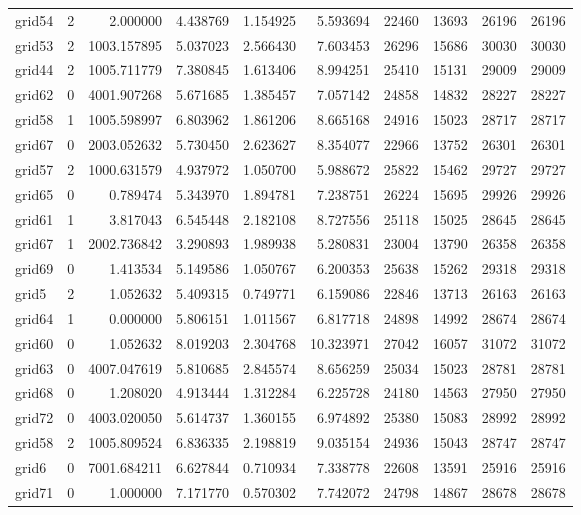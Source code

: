 \begin{longtable}{|l|r|r|r|r|r|r|r|r|r|}
grid54 & 2 & 2.000000 & 4.438769 & 1.154925 & 5.593694 & 22460 & 13693 & 26196 & 26196 \\
grid53 & 2 & 1003.157895 & 5.037023 & 2.566430 & 7.603453 & 26296 & 15686 & 30030 & 30030 \\
grid44 & 2 & 1005.711779 & 7.380845 & 1.613406 & 8.994251 & 25410 & 15131 & 29009 & 29009 \\
grid62 & 0 & 4001.907268 & 5.671685 & 1.385457 & 7.057142 & 24858 & 14832 & 28227 & 28227 \\
grid58 & 1 & 1005.598997 & 6.803962 & 1.861206 & 8.665168 & 24916 & 15023 & 28717 & 28717 \\
grid67 & 0 & 2003.052632 & 5.730450 & 2.623627 & 8.354077 & 22966 & 13752 & 26301 & 26301 \\
grid57 & 2 & 1000.631579 & 4.937972 & 1.050700 & 5.988672 & 25822 & 15462 & 29727 & 29727 \\
grid65 & 0 & 0.789474 & 5.343970 & 1.894781 & 7.238751 & 26224 & 15695 & 29926 & 29926 \\
grid61 & 1 & 3.817043 & 6.545448 & 2.182108 & 8.727556 & 25118 & 15025 & 28645 & 28645 \\
grid67 & 1 & 2002.736842 & 3.290893 & 1.989938 & 5.280831 & 23004 & 13790 & 26358 & 26358 \\
grid69 & 0 & 1.413534 & 5.149586 & 1.050767 & 6.200353 & 25638 & 15262 & 29318 & 29318 \\
grid5 & 2 & 1.052632 & 5.409315 & 0.749771 & 6.159086 & 22846 & 13713 & 26163 & 26163 \\
grid64 & 1 & 0.000000 & 5.806151 & 1.011567 & 6.817718 & 24898 & 14992 & 28674 & 28674 \\
grid60 & 0 & 1.052632 & 8.019203 & 2.304768 & 10.323971 & 27042 & 16057 & 31072 & 31072 \\
grid63 & 0 & 4007.047619 & 5.810685 & 2.845574 & 8.656259 & 25034 & 15023 & 28781 & 28781 \\
grid68 & 0 & 1.208020 & 4.913444 & 1.312284 & 6.225728 & 24180 & 14563 & 27950 & 27950 \\
grid72 & 0 & 4003.020050 & 5.614737 & 1.360155 & 6.974892 & 25380 & 15083 & 28992 & 28992 \\
grid58 & 2 & 1005.809524 & 6.836335 & 2.198819 & 9.035154 & 24936 & 15043 & 28747 & 28747 \\
grid6 & 0 & 7001.684211 & 6.627844 & 0.710934 & 7.338778 & 22608 & 13591 & 25916 & 25916 \\
grid71 & 0 & 1.000000 & 7.171770 & 0.570302 & 7.742072 & 24798 & 14867 & 28678 & 28678 \\

\end{longtable}
